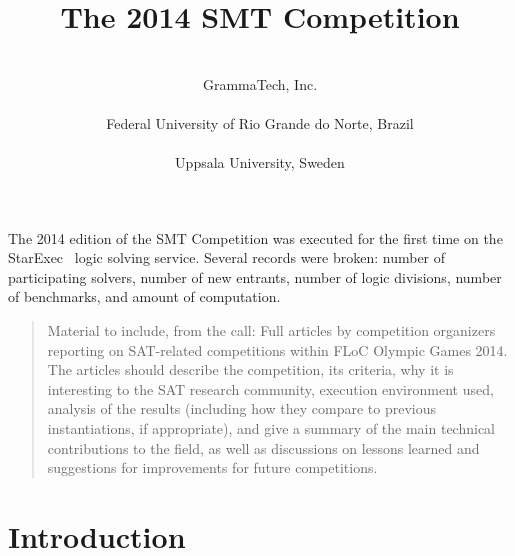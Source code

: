 \documentclass[twoside,11pt]{article}
\newcommand{\comment}[2]{\begin{quote}\sc #1\marginpar{\textcolor{red}{$\ast^{\mbox{#2}}$}}\end{quote}}
\newcommand{\davidc}[1]{\comment{#1}{DC}}
\begin{document}
\title{The 2014 SMT Competition}

\author{
 \\
\addr GrammaTech, Inc. \\
\AND
{}
 \\
\addr Federal University of Rio Grande do Norte, Brazil \\ 
\AND
{} \\
\addr Uppsala University, Sweden
}

\maketitle

The 2014 edition of the SMT Competition was executed for the first time on the StarExec~\cite{DBLP:conf/cade/StumpST14} logic solving service. Several records were broken: number of participating solvers, number of new entrants, number of logic divisions, number of benchmarks, and amount of computation.



\davidc{Material to include, from the call: Full articles by competition organizers reporting on SAT-related competitions
  within FLoC Olympic Games 2014. The articles should describe the competition,
  its criteria, why it is interesting to the SAT research community, execution
  environment used, analysis of the results (including how they compare to
  previous instantiations, if appropriate), and give a summary of the main
  technical contributions to the field, as well as discussions on lessons
  learned and suggestions for improvements for future competitions. }
		
	
\section{Introduction}
\label{sec:intro}
\end{document}

